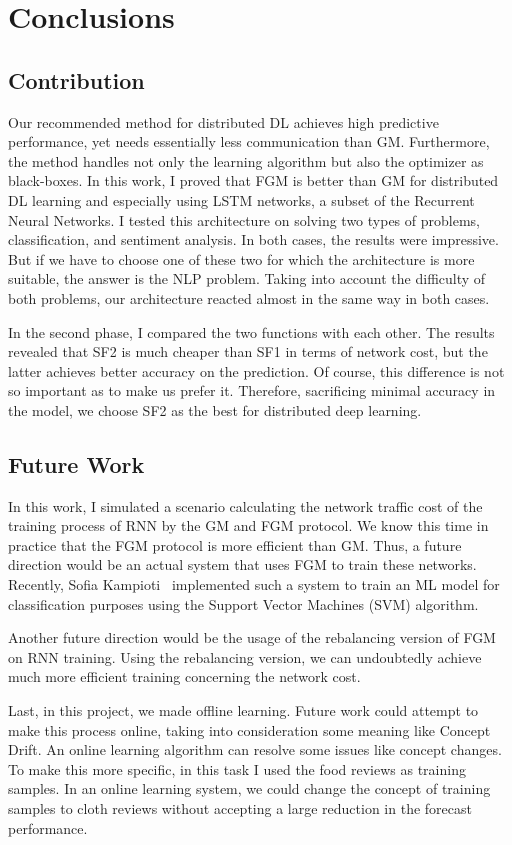 \chapter{Conclusions}\label{ch:conclusions}

\section{Contribution}\label{sec:conclusion}

Our recommended method for distributed DL achieves high predictive performance, yet needs essentially less communication than GM\@.
Furthermore, the method handles not only the learning algorithm but also the optimizer as black-boxes.
In this work, I proved that FGM is better than GM for distributed DL learning and especially using LSTM networks, a subset of the Recurrent Neural Networks.
I tested this architecture on solving two types of problems, classification, and sentiment analysis.
In both cases, the results were impressive.
But if we have to choose one of these two for which the architecture is more suitable, the answer is the NLP problem.
Taking into account the difficulty of both problems, our architecture reacted almost in the same way in both cases.

In the second phase, I compared the two functions with each other.
The results revealed that SF2 is much cheaper than SF1 in terms of network cost, but the latter achieves better accuracy on the prediction.
Of course, this difference is not so important as to make us prefer it.
Therefore, sacrificing minimal accuracy in the model, we choose SF2 as the best for distributed deep learning.

\section{Future Work}\label{sec:future-work}

In this work, I simulated a scenario calculating the network traffic cost of the training process of RNN by the GM and FGM protocol.
We know this time in practice that the FGM protocol is more efficient than GM.
Thus, a future direction would be an actual system that uses FGM to train these networks.
Recently, Sofia Kampioti~\cite{kampioti_sofia__thesis_2020} implemented such a system to train an ML model for classification purposes using the Support Vector Machines (SVM) algorithm.

Another future direction would be the usage of the rebalancing version of FGM on RNN training.
Using the rebalancing version, we can undoubtedly achieve much more efficient training concerning the network cost.

Last, in this project, we made offline learning.
Future work could attempt to make this process online, taking into consideration some meaning like Concept Drift.
An online learning algorithm can resolve some issues like concept changes.
To make this more specific, in this task I used the food reviews as training samples.
In an online learning system, we could change the concept of training samples to cloth reviews without accepting a large reduction in the forecast performance.
